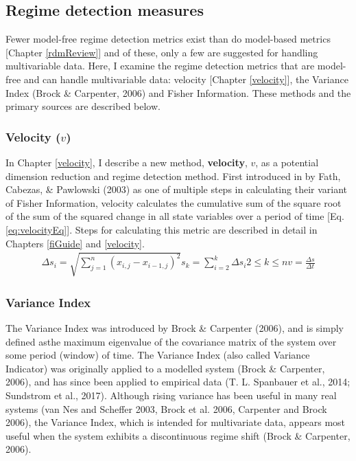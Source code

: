 \documentclass[12pt,twoside,openany]{reedthesis}
\begin{document}
\subsection{Regime detection measures}\label{regime-detection-measures}

Fewer model-free regime detection metrics exist than do model-based
metrics {[}Chapter \ref{rdmReview}{]} and of these, only a few are
suggested for handling multivariable data. Here, I examine the regime
detection metrics that are model-free and can handle multivariable data:
velocity {[}Chapter \ref{velocity}{]}, the Variance Index (Brock \&
Carpenter, 2006) and Fisher Information. These methods and the primary
sources are described below.

\subsubsection{\texorpdfstring{Velocity
(\(v\))}{Velocity (v)}}\label{velocity-v}

In Chapter \ref{velocity}, I describe a new method, \textbf{velocity},
\(v\), as a potential dimension reduction and regime detection method.
First introduced in by Fath, Cabezas, \& Pawlowski (2003) as one of
multiple steps in calculating their variant of Fisher Information,
velocity calculates the cumulative sum of the square root of the sum of
the squared change in all state variables over a period of time {[}Eq.
\eqref{eq:velocityEq}{]}. Steps for calculating this metric are described
in detail in Chapters \ref{fiGuide} and \ref{velocity}.
\begin{equation}
\begin{array}{rcr}
\Delta s_i = \sqrt{\sum_{j=1}^{n} (x_{i,j} -x_{i-1, j})^2}
s_k =  \sum_{i=2}^{k}\Delta{s_i}
2\leq k \leq n
v =\frac{\Delta s}{\Delta t}  
\end{array}
\label{eq:velocityEq}
\end{equation}
\subsubsection{Variance Index}\label{variance-index}

The Variance Index was introduced by Brock \& Carpenter (2006), and is
simply defined asthe maximum eigenvalue of the covariance matrix of the
system over some period (window) of time. The Variance Index (also
called Variance Indicator) was originally applied to a modelled system
(Brock \& Carpenter, 2006), and has since been applied to empirical data
(T. L. Spanbauer et al., 2014; Sundstrom et al., 2017). Although rising
variance has been useful in many real systems (van Nes and Scheffer
2003, Brock et al. 2006, Carpenter and Brock 2006), the Variance Index,
which is intended for multivariate data, appears most useful when the
system exhibits a discontinuous regime shift (Brock \& Carpenter, 2006).
\end{document}
